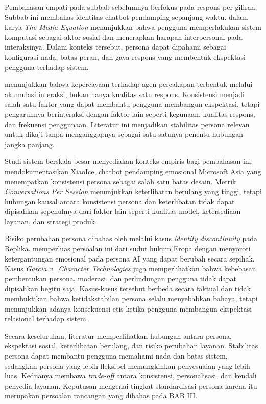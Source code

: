 Pembahasan empati pada subbab sebelumnya berfokus pada respons per giliran. Subbab ini membahas identitas chatbot pendamping sepanjang waktu. \textcite{reevesNass1996} dalam karya \textit{The Media Equation} menunjukkan bahwa pengguna memperlakukan sistem komputasi sebagai aktor sosial dan menerapkan harapan interpersonal pada interaksinya. Dalam konteks tersebut, persona dapat dipahami sebagai konfigurasi nada, batas peran, dan gaya respons yang membentuk ekspektasi pengguna terhadap sistem.

\textcite{bickmorePicard2005} menunjukkan bahwa kepercayaan terhadap agen percakapan terbentuk melalui akumulasi interaksi, bukan hanya kualitas satu respons. Konsistensi menjadi salah satu faktor yang dapat membantu pengguna membangun ekspektasi, tetapi pengaruhnya berinteraksi dengan faktor lain seperti kegunaan, kualitas respons, dan frekuensi penggunaan. Literatur ini menjadikan stabilitas persona relevan untuk dikaji tanpa menganggapnya sebagai satu-satunya penentu hubungan jangka panjang.

Studi sistem berskala besar menyediakan konteks empiris bagi pembahasan ini. \textcite{zhou2020xiaoice} mendokumentasikan XiaoIce, chatbot pendamping emosional Microsoft Asia yang menempatkan konsistensi persona sebagai salah satu batas desain. Metrik \textit{Conversations Per Session} menunjukkan keterlibatan berulang yang tinggi, tetapi hubungan kausal antara konsistensi persona dan keterlibatan tidak dapat dipisahkan sepenuhnya dari faktor lain seperti kualitas model, ketersediaan layanan, dan strategi produk.

Risiko perubahan persona dibahas oleh \textcite{defreitasReplika2024} melalui kasus \textit{identity discontinuity} pada Replika. \textcite{boine2023} memperluas persoalan ini dari sudut hukum Eropa dengan menyoroti ketergantungan emosional pada persona AI yang dapat berubah secara sepihak. Kasus \textit{Garcia v.\ Character Technologies} \parencite{garciaCharacterAI2024} juga memperlihatkan bahwa kebebasan pembentukan persona, moderasi, dan perlindungan pengguna tidak dapat dipisahkan begitu saja. Kasus-kasus tersebut berbeda secara faktual dan tidak membuktikan bahwa ketidakstabilan persona selalu menyebabkan bahaya, tetapi menunjukkan adanya konsekuensi etis ketika pengguna membangun ekspektasi relasional terhadap sistem.

Secara keseluruhan, literatur memperlihatkan hubungan antara persona, ekspektasi sosial, keterlibatan berulang, dan risiko perubahan layanan. Stabilitas persona dapat membantu pengguna memahami nada dan batas sistem, sedangkan persona yang lebih fleksibel memungkinkan penyesuaian yang lebih luas. Keduanya membawa \textit{trade-off} antara konsistensi, personalisasi, dan kendali penyedia layanan. Keputusan mengenai tingkat standardisasi persona karena itu merupakan persoalan rancangan yang dibahas pada BAB III.

